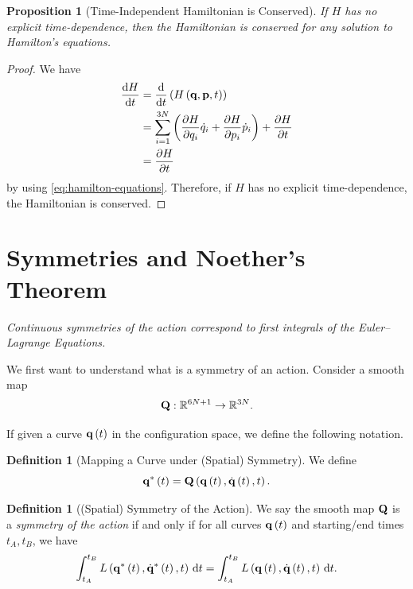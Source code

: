 \documentclass[11pt]{article}
\numberwithin{equation}{section}
\newtheorem{proposition}[theorem]{Proposition}
\theoremstyle{definition}
\newtheorem{definition}[theorem]{Definition}
\theoremstyle{remark}
\newcommand{\pqty}[1]{\left(#1\right)}
\newcommand{\functiondomain}[3]{#1:#2\to #3}
\newcommand{\RR}{\mathbb{R}}
\begin{document}
\begin{proposition}[Time-Independent Hamiltonian is Conserved]\label{variation-unit-0072}
    If \(H\) has no explicit time-dependence, then the Hamiltonian is conserved for any solution to Hamilton's equations.
\end{proposition}

\begin{proof}
    We have
    \begin{align*}
        \dv{H}{t} &= \dv{t} \pqty{H \pqty{\vb{q}, \vb{p}, t}} \\
        &= \sum_{i = 1}^{3N} \pqty{\pdv{H}{q_i} \dot{q}_i + \pdv{H}{p_i} \dot{p}_i} + \pdv{H}{t} \\
        &= \pdv{H}{t}
    \end{align*}
    by using \autoref{eq:hamilton-equations}. Therefore, if \(H\) has no explicit time-dependence, the Hamiltonian is conserved.
\end{proof}

\section{Symmetries and Noether's Theorem}

\textit{Continuous symmetries of the action correspond to first integrals of the Euler--Lagrange Equations.}

We first want to understand what is a symmetry of an action. Consider a smooth map
\[
    \functiondomain{\vb{Q}}{\RR^{6N + 1}}{\RR^{3N}}.
\]

If given a curve \(\vb{q} \pqty{t}\) in the configuration space, we define the following notation.

\begin{definition}[Mapping a Curve under (Spatial) Symmetry]\label{variation-unit-0073}
    We define
    \begin{equation}
        \label{eq:mapping-curve-spatial-symmetry}%
        \vb{q}^{\ast}\pqty{t} = \vb{Q} \pqty{\vb{q} \pqty{t}, \dot{\vb{q}} \pqty{t}, t}.
    \end{equation}
\end{definition}

\begin{definition}[(Spatial) Symmetry of the Action]\label{variation-unit-0074}
    We say the smooth map \(\vb{Q}\) is a \emph{symmetry of the action} if and only if for all curves \(\vb{q} \pqty{t}\) and starting/end times \(t_A, t_B\), we have
    \begin{equation}
        \label{eq:symmetry-of-action}%
        \int_{t_A}^{t_B} L\pqty{\vb{q}^{\ast} \pqty{t}, \dot{\vb{q}}^{\ast} \pqty{t}, t} \dd{t} = \int_{t_A}^{t_B} L \pqty{\vb{q} \pqty{t}, \dot{\vb{q}} \pqty{t}, t} \dd{t}.
    \end{equation}
\end{definition}
\end{document}

